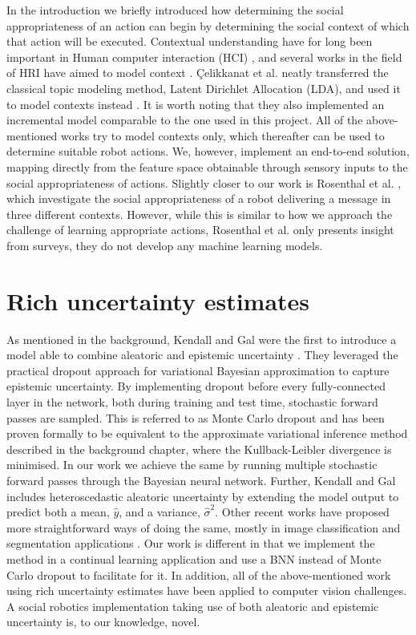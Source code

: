 \documentclass[a4paper,12pt]{report}
\begin{document}
In the introduction we briefly introduced how determining the social appropriateness of an action can begin by determining the social context of which that action will be executed. Contextual understanding have for long been important in Human computer interaction (HCI)  \cite{dey2001understanding}, and several works in the field of HRI have aimed to model context \cite{mastrogiovanni2009context, larochelle2011establishing}. Çelikkanat et al. neatly transferred the classical topic modeling method, Latent Dirichlet Allocation (LDA),  and used it to model contexts instead \cite{celikkanat2015learning}. It is worth noting that they also implemented an incremental model comparable to the one used in this project. All of the above-mentioned works try to model contexts only, which thereafter can be used to determine suitable robot actions. We, however, implement an end-to-end solution, mapping directly from the feature space obtainable through sensory inputs to the social appropriateness of actions. Slightly closer to our work is Rosenthal et al. \cite{rosenthal2020context}, which investigate the social appropriateness of a robot delivering a message in three different contexts. However, while this is similar to how we approach the challenge of learning appropriate actions, Rosenthal et al. only presents insight from surveys, they do not develop any machine learning models.

\section{Rich uncertainty estimates}
As mentioned in the background, Kendall and Gal were the first to introduce a model able to combine aleatoric and epistemic uncertainty \cite{kendall2017uncertainties}. They leveraged the practical dropout approach \cite{gal2016dropout} for variational Bayesian approximation to capture epistemic uncertainty. By implementing dropout before every fully-connected layer in the network, both during training and test time, stochastic forward passes are sampled. This is referred to as Monte Carlo dropout and has been proven formally to be equivalent to the approximate variational inference method described in the background chapter, where the Kullback-Leibler divergence is minimised. In our work we achieve the same by running multiple stochastic forward passes through the Bayesian neural network. Further, Kendall and Gal includes heteroscedastic aleatoric uncertainty by extending the model output to predict  both a mean, $\hat{y}$, and a variance, $\hat{\sigma}^2$. Other recent works have proposed more straightforward ways of doing the same, mostly in image classification and segmentation applications \cite{kwon2018uncertainty, shridhar2018uncertainty}. Our work is different in that we implement the method in a continual learning application and use a BNN instead of Monte Carlo dropout to facilitate for it. In addition, all of the above-mentioned work using rich uncertainty estimates have been applied to computer vision challenges. A social robotics implementation taking use of both aleatoric and epistemic uncertainty is, to our knowledge, novel.
\end{document}

